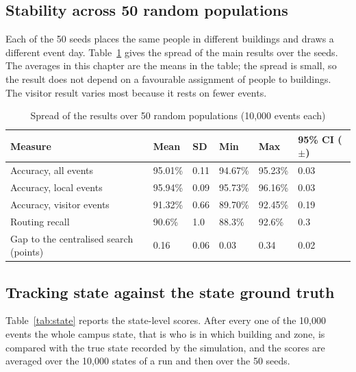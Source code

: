 \documentclass[12pt,a4paper,oneside]{report}
\begin{document}
\subsection{Stability across 50 random populations}\label{sec:res-seeds}
Each of the 50 seeds places the same people in different buildings and draws a different event day. Table~\ref{tab:seeds} gives the spread of the main results over the seeds. The averages in this chapter are the means in the table; the spread is small, so the result does not depend on a favourable assignment of people to buildings. The visitor result varies most because it rests on fewer events.

\begin{table}[htbp]
\centering
\caption{Spread of the results over 50 random populations (10,000 events each)}\label{tab:seeds}
{\small\setlength{\tabcolsep}{4pt}\renewcommand{\arraystretch}{1.2}
\begin{tabular}{|p{3.6cm}|p{1.9cm}|p{1.9cm}|p{1.9cm}|p{1.9cm}|p{2.4cm}|}\hline
\textbf{Measure} & \textbf{Mean} & \textbf{SD} & \textbf{Min} & \textbf{Max} & \textbf{95\% CI ($\pm$)}\\\hline
Accuracy, all events & 95.01\% & 0.11 & 94.67\% & 95.23\% & 0.03\\\hline
Accuracy, local events & 95.94\% & 0.09 & 95.73\% & 96.16\% & 0.03\\\hline
Accuracy, visitor events & 91.32\% & 0.66 & 89.70\% & 92.45\% & 0.19\\\hline
Routing recall & 90.6\% & 1.0 & 88.3\% & 92.6\% & 0.3\\\hline
Gap to the centralised search (points) & 0.16 & 0.06 & 0.03 & 0.34 & 0.02\\\hline
\end{tabular}}
\end{table}

\subsection{Tracking state against the state ground truth}\label{sec:res-state}
Table~\ref{tab:state} reports the state-level scores. After every one of the 10,000 events the whole campus state, that is who is in which building and zone, is compared with the true state recorded by the simulation, and the scores are averaged over the 10,000 states of a run and then over the 50 seeds.
\end{document}
